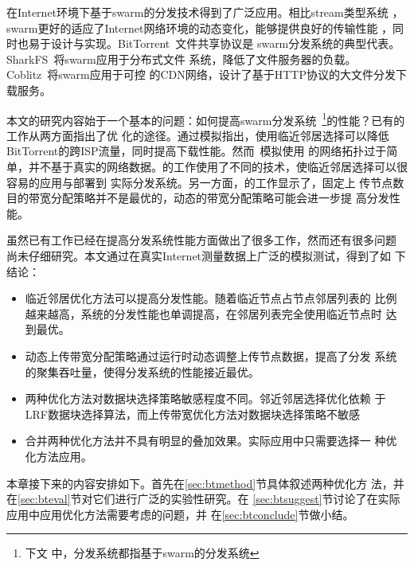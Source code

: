在Internet环境下基于swarm的分发技术得到了广泛应用。相比stream类型系统
，swarm更好的适应了Internet网络环境的动态变化，能够提供良好的传输性能
，同时也易于设计与实现。BitTorrent~\cite{bittorrent}文件共享协议是
swarm分发系统的典型代表。SharkFS~\cite{sharkfs}将swarm应用于分布式文件
系统，降低了文件服务器的负载。Coblitz~\cite{coblitz}将swarm应用于可控
的CDN网络，设计了基于HTTP协议的大文件分发下载服务。

本文的研究内容始于一个基本的问题：如何提高swarm分发系统~\footnote{下文
中，分发系统都指基于swarm的分发系统}的性能？已有的工作从两方面指出了优
化的途径。通过模拟指出，使用临近邻居选择可以降低
BitTorrent的跨ISP流量，同时提高下载性能。然而~模拟使用
的网络拓扑过于简单，并不基于真实的网络数据。的工作使用了不同的技术，使临近邻居选择可以很容易的应用与部署到
实际分发系统。另一方面，的工作显示了，固定上
传节点数目的带宽分配策略并不是最优的，动态的带宽分配策略可能会进一步提
高分发性能。


虽然已有工作已经在提高分发系统性能方面做出了很多工作，然而还有很多问题
尚未仔细研究。本文通过在真实Internet测量数据上广泛的模拟测试，得到了如
下结论：


\begin{itemize}

  \item 临近邻居优化方法可以提高分发性能。随着临近节点占节点邻居列表的
  比例越来越高，系统的分发性能也单调提高，在邻居列表完全使用临近节点时
  达到最优。

  \item 动态上传带宽分配策略通过运行时动态调整上传节点数据，提高了分发
  系统的聚集吞吐量，使得分发系统的性能接近最优。

  \item 两种优化方法对数据块选择策略敏感程度不同。邻近邻居选择优化依赖
  于LRF数据块选择算法，而上传带宽优化方法对数据块选择策略不敏感

  \item 合并两种优化方法并不具有明显的叠加效果。实际应用中只需要选择一
  种优化方法应用。
\end{itemize}

本章接下来的内容安排如下。首先在\ref{sec:btmethod}节具体叙述两种优化方
法，并在\ref{sec:bteval}节对它们进行广泛的实验性研究。在
\ref{sec:btsuggest}节讨论了在实际应用中应用优化方法需要考虑的问题，并
在\ref{sec:btconclude}节做小结。

